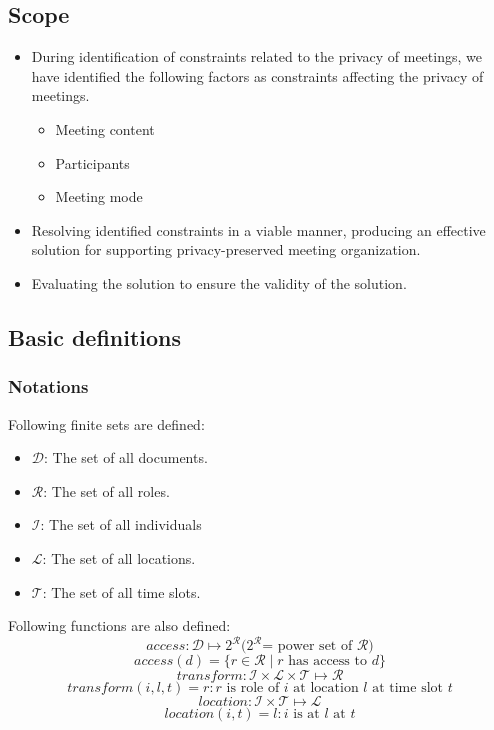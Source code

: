 \begin{spacing}{1.0}
    \subsection{Scope}
    \begin{itemize}
        \item During identification of constraints related to the privacy of meetings, we have identified the following factors as constraints affecting the privacy of meetings.
        \begin{itemize}
            \item Meeting content
            \item Participants
            \item Meeting mode
        \end{itemize}
        \item Resolving identified constraints in a viable manner, producing an effective solution for supporting privacy-preserved meeting organization.
        \item Evaluating the solution to ensure the validity of the solution.
    \end{itemize}

    \newpage
    \subsection{Basic definitions}

    \subsubsection{Notations}
    \noindent
    Following finite sets are defined:
    \begin{itemize}
        \item $\mathcal{D}$: The set of all documents.
        \item $\mathcal{R}$: The set of all roles.
        \item $\mathcal{I}$: The set of all individuals
        \item $\mathcal{L}$: The set of all locations.
        \item $\mathcal{T}$: The set of all time slots.
    \end{itemize}

    \noindent
    Following functions are also defined:
        \[ access: \mathcal{D} \mapsto 2^\mathcal{R} \text{(} 2^\mathcal{R} \text{= power set of } \mathcal{R} \text{)} \] 
        \[ access(d) = \{ r \in \mathcal{R} \mid r \text{ has access to } d \} \] 
        \[ transform: \mathcal{I} \times \mathcal{L} \times \mathcal{T} \mapsto \mathcal{R} \] 
        \[ transform(i, l, t) = r : r \text{ is role of } i \text{ at location } l \text{ at time slot } t \] 
        \[ location: \mathcal{I} \times \mathcal{T} \mapsto \mathcal{L} \] 
        \[ location(i, t)  = l : i \text{ is at } l \text{ at } t \]


\end{spacing}
